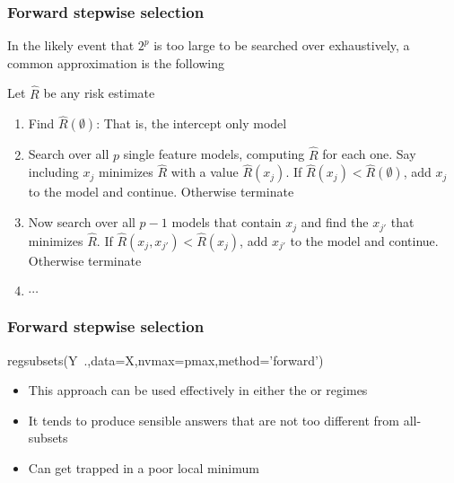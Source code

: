 \documentclass{beamer}
\begin{document}

\begin{frame}[fragile]
\frametitle{Forward stepwise selection}
In the likely event that $2^p$ is too large to be searched over exhaustively, a common 
approximation is the following

\vsp
Let $\hat{R}$ be any risk estimate
\begin{enumerate}
\item Find $\hat{R}(\emptyset)$: That is, the intercept only model
\item Search over all $p$ single feature models, computing $\hat{R}$ for each one.  Say including $x_j$
minimizes $\hat{R}$ with a value $\hat{R}(x_j)$.  If $\hat{R}(x_j) < \hat{R}(\emptyset)$, add $x_j$
to the model and continue.  Otherwise terminate
\item Now search over all $p-1$ models that contain $x_j$ and find the $x_{j'}$ that minimizes $\hat{R}$.  
If $\hat{R}(x_j,x_{j'}) < \hat{R}(x_j)$, add $x_{j'}$
to the model and continue.  Otherwise terminate
\item $\cdots$
\end{enumerate}
\end{frame}

\begin{frame}[fragile]
\frametitle{Forward stepwise selection}
\begin{blockcode}
regsubsets(Y~.,data=X,nvmax=pmax,method='forward')
\end{blockcode}

\begin{itemize}
\item This approach can be used effectively in either the  or  regimes
\item It tends to produce sensible answers that are not too different from all-subsets
\end{itemize}
\vsp

\begin{itemize}
\item Can get trapped in a poor local minimum
\end{itemize}
\end{frame}
\end{document}
